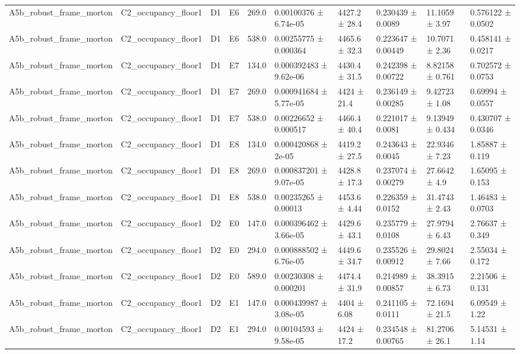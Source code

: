 \begin{table}
\begin{tabular}{llllllllll}
A5b\_robust\_frame\_morton & C2\_occupancy\_floor1 & D1 & E6 & 269.0 & 0.00100376 ± 6.74e-05 & 4427.2 ± 28.4 & 0.230439 ± 0.0089 & 11.1059 ± 3.97 & 0.576122 ± 0.0502 \\
A5b\_robust\_frame\_morton & C2\_occupancy\_floor1 & D1 & E6 & 538.0 & 0.00255775 ± 0.000364 & 4465.6 ± 32.3 & 0.223647 ± 0.00449 & 10.7071 ± 2.36 & 0.458141 ± 0.0217 \\
A5b\_robust\_frame\_morton & C2\_occupancy\_floor1 & D1 & E7 & 134.0 & 0.000392483 ± 9.62e-06 & 4430.4 ± 31.5 & 0.242398 ± 0.00722 & 8.82158 ± 0.761 & 0.702572 ± 0.0753 \\
A5b\_robust\_frame\_morton & C2\_occupancy\_floor1 & D1 & E7 & 269.0 & 0.000941684 ± 5.77e-05 & 4424 ± 21.4 & 0.236149 ± 0.00285 & 9.42723 ± 1.08 & 0.69994 ± 0.0557 \\
A5b\_robust\_frame\_morton & C2\_occupancy\_floor1 & D1 & E7 & 538.0 & 0.00226652 ± 0.000517 & 4466.4 ± 40.4 & 0.221017 ± 0.0081 & 9.13949 ± 0.434 & 0.430707 ± 0.0346 \\
A5b\_robust\_frame\_morton & C2\_occupancy\_floor1 & D1 & E8 & 134.0 & 0.000420868 ± 2e-05 & 4419.2 ± 27.5 & 0.243643 ± 0.0045 & 22.9346 ± 7.23 & 1.85887 ± 0.119 \\
A5b\_robust\_frame\_morton & C2\_occupancy\_floor1 & D1 & E8 & 269.0 & 0.000837201 ± 9.07e-05 & 4428.8 ± 17.3 & 0.237074 ± 0.00279 & 27.6642 ± 4.9 & 1.65095 ± 0.153 \\
A5b\_robust\_frame\_morton & C2\_occupancy\_floor1 & D1 & E8 & 538.0 & 0.00235265 ± 0.00013 & 4453.6 ± 4.44 & 0.226359 ± 0.0152 & 31.4743 ± 2.43 & 1.46483 ± 0.0703 \\
A5b\_robust\_frame\_morton & C2\_occupancy\_floor1 & D2 & E0 & 147.0 & 0.000396462 ± 3.66e-05 & 4429.6 ± 43.1 & 0.235779 ± 0.0108 & 27.9794 ± 6.43 & 2.76637 ± 0.349 \\
A5b\_robust\_frame\_morton & C2\_occupancy\_floor1 & D2 & E0 & 294.0 & 0.000888502 ± 6.76e-05 & 4449.6 ± 34.7 & 0.235526 ± 0.00912 & 29.8024 ± 7.66 & 2.55034 ± 0.172 \\
A5b\_robust\_frame\_morton & C2\_occupancy\_floor1 & D2 & E0 & 589.0 & 0.00230308 ± 0.000201 & 4474.4 ± 31.9 & 0.214989 ± 0.00857 & 38.3915 ± 6.73 & 2.21506 ± 0.131 \\
A5b\_robust\_frame\_morton & C2\_occupancy\_floor1 & D2 & E1 & 147.0 & 0.000439987 ± 3.08e-05 & 4404 ± 6.08 & 0.241105 ± 0.0111 & 72.1694 ± 21.5 & 6.09549 ± 1.22 \\
A5b\_robust\_frame\_morton & C2\_occupancy\_floor1 & D2 & E1 & 294.0 & 0.00104593 ± 9.58e-05 & 4424 ± 17.2 & 0.234548 ± 0.00765 & 81.2706 ± 26.1 & 5.14531 ± 1.14 \\

\end{tabular}
\end{table}
